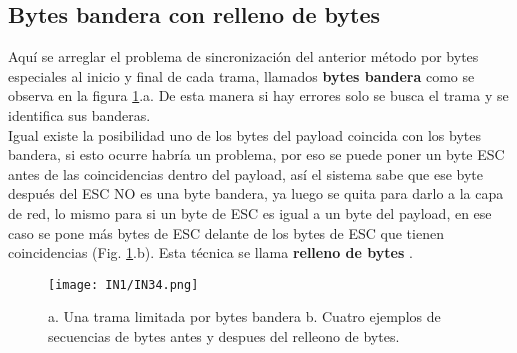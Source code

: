 \documentclass[
	12pt, %
	fleqn, %
	a4paper, %
]{LegrandOrangeBook}
\begin{document}
\subsection{Bytes bandera con relleno de bytes}
Aquí se arreglar el problema de sincronización del anterior método por bytes especiales al inicio y final de cada trama, llamados \textbf{bytes bandera} como se observa en la figura \ref{fig: bytes bandera}.a. De esta manera si hay errores solo se busca el trama y se identifica sus banderas.\\
Igual existe la posibilidad uno de los bytes del payload coincida con los bytes bandera, si esto ocurre habría un problema, por eso se puede poner un byte ESC antes de las coincidencias dentro del payload, así el sistema sabe que ese byte después del ESC NO es una byte bandera, ya luego se quita para darlo a la capa de red, lo mismo para si un byte de ESC es igual a un byte del payload, en ese caso se pone más bytes de ESC delante de los bytes de ESC que tienen coincidencias (Fig. \ref{fig: bytes bandera}.b). Esta técnica se llama \textbf{relleno de bytes} .
\begin{figure}[]
\centering
\texttt{[image: IN1/IN34.png]}
\caption{a. Una trama limitada por bytes bandera b. Cuatro ejemplos de secuencias de bytes antes y despues del relleono de bytes.}
\label{fig: bytes bandera}
\end{figure}
\end{document}
